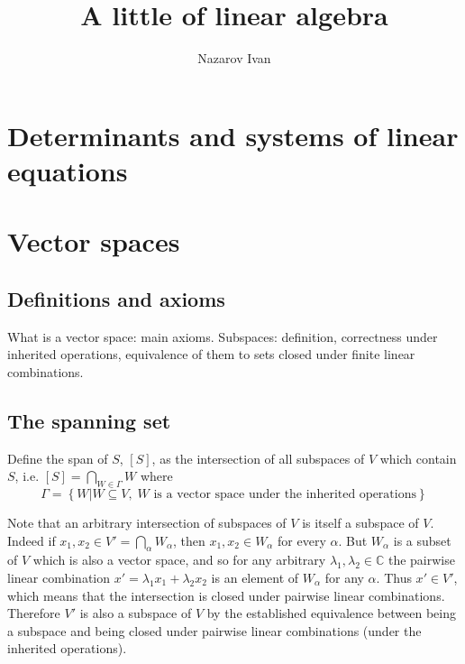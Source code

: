 \documentclass[a4paper]{article}
\title{A little of linear algebra}
\author{Nazarov Ivan}
\newcommand{\obj}[1]{\ensuremath{\left\{ #1 \right\}}}
\newcommand{\spn}[1]{\ensuremath{\left[ #1 \right]}}
\begin{document}
\maketitle
\section{Determinants and systems of linear equations} %
\label{sec:determinants_and_linear_systems}



\section{Vector spaces} %
\label{sec:vector_spaces}

\subsection{Definitions and axioms} %
\label{sub:definitions_and_axioms}
What is a vector space: main axioms. Subspaces: definition, correctness under inherited operations, equivalence of them to sets closed under finite linear combinations.

\subsection{The spanning set} %
\label{sub:the_spanning_set}
Define the span of $S$, $\spn{S}$, as the intersection of all subspaces of $V$ which contain $S$, i.e. $\spn{S} = \bigcap_{W \in \Gamma } W$ where \[\Gamma = \obj{W \vert W \subseteq V,\; W \text{ is a vector space under the inherited operations}}\]

Note that an arbitrary intersection of subspaces of $V$ is itself a subspace of $V$. Indeed if $x_1, x_2 \in V' = \bigcap_\alpha W_\alpha$, then $x_1, x_2 \in W_\alpha$ for every $\alpha$. But $W_\alpha$ is a subset of $V$ which is also a vector space, and so for any arbitrary $\lambda_1, \lambda_2 \in \mathbb{C}$ the pairwise linear combination $x' = \lambda_1 x_1 + \lambda_2 x_2$ is an element of $W_\alpha$ for any $\alpha$. Thus $x' \in V'$, which means that the intersection is closed under pairwise linear combinations. Therefore $V'$ is also a subspace of $V$ by the established equivalence between being a subspace and being closed under pairwise linear combinations (under the inherited operations).
\end{document}

